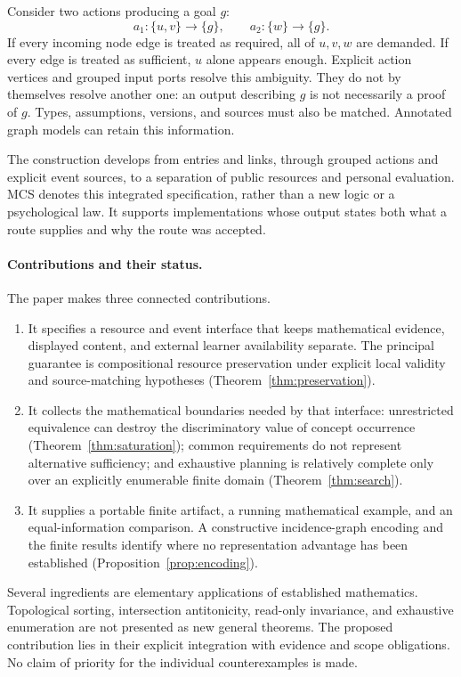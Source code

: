 \documentclass[11pt,a4paper]{article}
\theoremstyle{remark}
\begin{document}
Consider two actions producing a goal \(g\):
\[
 a_1:\{u,v\}\longrightarrow\{g\},
 \qquad a_2:\{w\}\longrightarrow\{g\}.
\]
If every incoming node edge is treated as required, all of \(u,v,w\) are demanded.
If every edge is treated as sufficient, \(u\) alone appears enough. Explicit
action vertices and grouped input ports resolve this ambiguity.
They do not by themselves resolve another one: an output describing \(g\) is
not necessarily a proof of \(g\). Types, assumptions, versions, and sources must
also be matched. Annotated graph models can retain this information.

The construction develops from entries and links, through grouped actions and
explicit event sources, to a separation of public resources and personal
evaluation. MCS denotes this integrated specification, rather than a new logic
or a psychological law. It supports implementations whose output states both
what a route supplies and why the route was accepted.

\paragraph{Contributions and their status.}
The paper makes three connected contributions.
\begin{enumerate}
\item It specifies a resource and event interface that keeps mathematical
evidence, displayed content, and external learner availability separate.
The principal guarantee is compositional resource preservation under explicit
local validity and source-matching hypotheses
(Theorem~\ref{thm:preservation}).
\item It collects the mathematical boundaries needed by that interface:
unrestricted equivalence can destroy the discriminatory value of concept
occurrence (Theorem~\ref{thm:saturation}); common requirements do not represent
alternative sufficiency; and exhaustive planning is relatively complete only
over an explicitly enumerable finite domain
(Theorem~\ref{thm:search}).
\item It supplies a portable finite artifact, a running mathematical example,
and an equal-information comparison. A constructive incidence-graph encoding
and the finite results identify where no representation advantage
has been established (Proposition~\ref{prop:encoding}).
\end{enumerate}
Several ingredients are elementary applications of established mathematics.
Topological sorting, intersection antitonicity, read-only invariance, and
exhaustive enumeration are not presented as new general theorems. The proposed
contribution lies in their explicit integration with evidence and scope
obligations. No claim of priority for the individual counterexamples is made.
\end{document}
